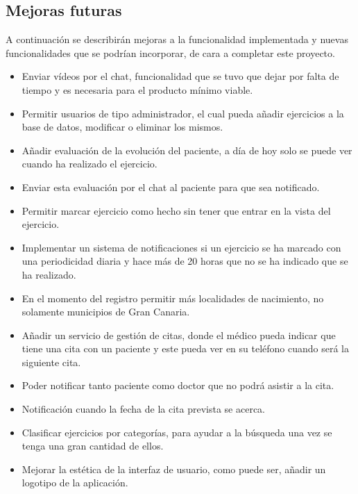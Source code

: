 \subsection{Mejoras futuras}
A continuación se describirán mejoras a la funcionalidad
implementada y nuevas funcionalidades que se podrían incorporar, de
cara a completar este proyecto.
\begin{itemize}
    \item Enviar vídeos por el chat, funcionalidad que se tuvo que
    dejar por falta de tiempo y es necesaria para el producto
    mínimo viable.
    \item Permitir usuarios de tipo administrador, el cual pueda añadir
    ejercicios a la base de datos, modificar o eliminar los mismos.
    \item Añadir evaluación de la evolución del paciente, a día de hoy
    solo se puede ver cuando ha realizado el ejercicio.
    \item Enviar esta evaluación por el chat al paciente para que sea
    notificado.
    \item Permitir marcar ejercicio como hecho sin tener que entrar
    en la vista del ejercicio.
    \item Implementar un sistema de notificaciones si un ejercicio
    se ha marcado con una periodicidad diaria y hace más de 20 horas
    que no se ha indicado que se ha realizado.
    \item En el momento del registro permitir más localidades de
    nacimiento, no solamente municipios de Gran Canaria.
    \item Añadir un servicio de gestión de citas, donde el médico
    pueda indicar que tiene una cita con un paciente y este pueda
    ver en su teléfono cuando será la siguiente cita.
    \item Poder notificar tanto paciente como doctor que no podrá
    asistir a la cita.
    \item Notificación cuando la fecha de la cita prevista se acerca.
    \item Clasificar ejercicios por categorías, para ayudar a la búsqueda
    una vez se tenga una gran cantidad de ellos.
    \item Mejorar la estética de la interfaz de usuario, como puede ser,
    añadir un logotipo de la aplicación.
\end{itemize}